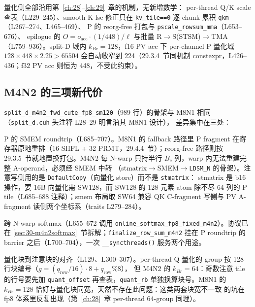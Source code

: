 量化侧全部沿用第~\ref{ch:28}--\ref{ch:29}~章的机制，无新增数学：
per-thread Q/K scale 查表（L229--245）、smooth-K lse 修正只在
\texttt{kv\_tile==0} 逐 chunk 累积 \texttt{qkm}（L267--274、L465--469）、
P 的 reorg-free 打包与 \texttt{pscale\_rowsum\_mma}（L653--676）、
epilogue 的 $O=o_{\text{acc}}\cdot(1/448)/\ell$ 与批量
R$\to$S(STSM)$\to$TMA（L759--936）。split-D 域内
$k_{Bc}=128$，f16 PV acc 下 per-channel P 量化域
$128\times448\times2.25>65504$
会自动收窄到 224（29.3.4~节同机制 constexpr，L426--436；f32 PV acc
则恒为 448，不受此约束）。

\subsection{M4N2 的三项新代价}

\texttt{split\_d\_m4n2\_fwd\_cute\_fp8\_sm120}（989 行）的骨架与
M8N1 相同（\texttt{split\_d.cuh} 头注释 L28--29 明言沿其 M8N1 设计），
差异集中在三处：

P 的 SMEM roundtrip（L685--707）。M8N1 的 fallback 路径里 P fragment
在寄存器原地重排（16 SHFL + 32 PRMT，29.4.4~节）；reorg-free 路径则按
29.3.5~节就地置换打包。M4N2 每 N-warp 只持半行
$B_c$ 列，warp 内无法重建完整 A-operand，必须经 SMEM 中转
（stmatrix$\to$SMEM$\to$\texttt{LDSM\_N} 的骨架）。注意写侧用的是
\texttt{DefaultCopy}（向量化 store）而不是 \texttt{stmatrix}：
stmatrix 是 b16 操作，要 16B 向量化需 SW128，而 SW128 的 128 元素
atom 除不尽 64 列的 P tile（L685--688 注释）；smem 布局取 SW64 兼容
QK C-fragment 写侧与 PV A-fragment 读侧两个坐标系（traits L279--284）。

跨 N-warp softmax（L655--672 调用
\texttt{online\_softmax\allowbreak{}\_fp8\allowbreak{}\_fixed\allowbreak{}\_m4n2}）。协议已在
\ref{sec:30-m4n2softmax}~节拆解；\texttt{finalize\_row\_sum\allowbreak{}\_m4n2}
挂在 P roundtrip 的 barrier 之后（L700--704），一次
\texttt{\_\_syncthreads()} 服务两个用途。

量化块到注意块的对齐（L129、L300--307）。per-thread Q 量化的
group 按 128 行块编号（$g=(q_{\text{row}}/16)\cdot8+q_{\text{row}}\%8$），
但 M4N2 的 $k_{Br}=64$：奇数注意 tile 的行号要先加
\texttt{quant\_offset} 再查表，\texttt{quant\_rb} 单独换算块号。M8N1
的 $k_{Br}=128$ 恰好与量化块同宽，天然不存在此问题：这类两套块宽不一致
的坑在 fp8 体系里反复出现（第~\ref{ch:28}~章 per-thread 64-group 同理）。

